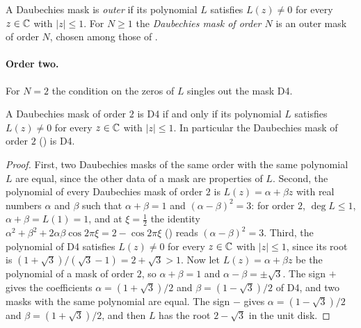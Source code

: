 \begin{definition}
\label{def:daub-outer-mask}
\leanok
{}
A Daubechies mask is \emph{outer} if its polynomial $L$ satisfies $L(z) \neq 0$ for every
$z \in \mathbb{C}$ with $|z| \leq 1$. For $N \geq 1$ the \emph{Daubechies mask of order $N$} is an outer
mask of order $N$, chosen among those of .
\end{definition}

\paragraph{Order two.}
For $N = 2$ the condition on the zeros of $L$ singles out the mask D4.

\begin{proposition}
\label{prop:daub-d4-outer}
\leanok
{}
A Daubechies mask of order $2$ is D4 if and only if its polynomial $L$ satisfies $L(z) \neq 0$
for every $z \in \mathbb{C}$ with $|z| \leq 1$. In particular the Daubechies mask of order $2$
() is D4.
\end{proposition}

\begin{proof}
\leanok
{}
First, two Daubechies masks of the same order with the same polynomial $L$ are equal, since the
other data of a mask are properties of $L$. Second, the polynomial of every Daubechies mask of
order $2$ is $L(z) = \alpha + \beta z$ with real numbers $\alpha$ and $\beta$ such that
$\alpha + \beta = 1$ and $(\alpha - \beta)^2 = 3$: for order $2$, $\deg L \leq 1$,
$\alpha + \beta = L(1) = 1$, and at $\xi = \frac12$ the identity
$\alpha^2 + \beta^2 + 2\alpha\beta \cos 2\pi\xi = 2 - \cos 2\pi\xi$
() reads $(\alpha - \beta)^2 = 3$. Third, the polynomial of D4
satisfies $L(z) \neq 0$ for every $z \in \mathbb{C}$ with $|z| \leq 1$, since its root is
$(1 + \sqrt 3)/(\sqrt 3 - 1) = 2 + \sqrt 3 > 1$. Now let $L(z) = \alpha + \beta z$ be the
polynomial of a mask of order $2$, so $\alpha + \beta = 1$ and $\alpha - \beta = \pm \sqrt 3$.
The sign $+$ gives the coefficients $\alpha = (1 + \sqrt 3)/2$ and $\beta = (1 - \sqrt 3)/2$ of
D4, and two masks with the same polynomial are equal. The sign $-$ gives
$\alpha = (1 - \sqrt 3)/2$ and $\beta = (1 + \sqrt 3)/2$, and then $L$ has the root
$2 - \sqrt 3$ in the unit disk.
\end{proof}

